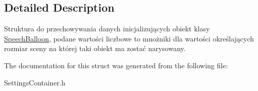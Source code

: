 \subsection{Detailed Description}
Struktura do przechowywania danych inicjalizujących obiekt klasy \mbox{\hyperlink{class_speech_balloon}{Speech\+Balloon}}, podane wartości liczbowe to mnożniki dla wartości określających rozmiar sceny na której taki obiekt ma zostać narysowany. 

The documentation for this struct was generated from the following file\+:\begin{DoxyCompactItemize}
\item 
Settings\+Container.\+h\end{DoxyCompactItemize}
